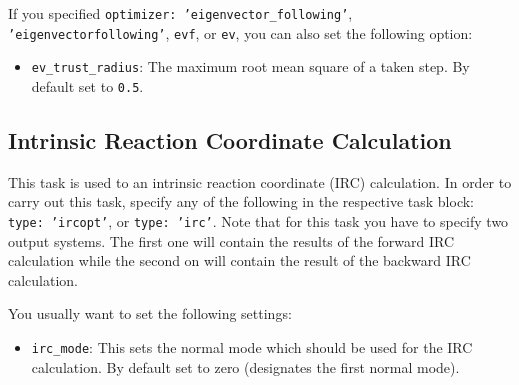 \documentclass[]{tufte-book}
\begin{document}
If you specified \texttt{optimizer: 'eigenvector\_following'}, \texttt{'eigenvectorfollowing'}, \texttt{evf}, or \texttt{ev}, 
you can also set the following option:
\begin{itemize}
\item \texttt{ev\_trust\_radius}: The maximum root mean square of a taken step. By default set to \texttt{0.5}.
\end{itemize}

\subsection{Intrinsic Reaction Coordinate Calculation}

This task is used to an intrinsic reaction coordinate (IRC) calculation. In 
order to carry out this task, specify any of the following in the respective task block: \texttt{type: 'ircopt'}, 
or \texttt{type: 'irc'}. Note that for this task you have to specify two output systems. The first one will contain
the results of the forward IRC calculation while the second on will contain the result of the backward IRC calculation.

You usually want to set the following settings:
\begin{itemize}
\item \texttt{irc\_mode}: This sets the normal mode which should be used for the IRC calculation. By default set to zero
(designates the first normal mode).
\end{itemize}
\end{document}
